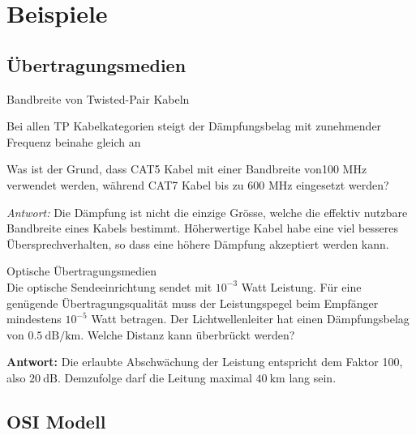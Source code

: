 \section{Beispiele}

\subsection*{Übertragungsmedien}

\begin{example2}{Bandbreite von Twisted-Pair Kabeln}

Bei allen TP Kabelkategorien steigt der Dämpfungsbelag mit zunehmender Frequenz beinahe gleich an

Was ist der Grund, dass CAT5 Kabel mit einer Bandbreite von100 MHz verwendet werden, während CAT7 Kabel bis zu 600 MHz eingesetzt werden?

\emph{Antwort:}
Die Dämpfung ist nicht die einzige Grösse, welche die effektiv nutzbare Bandbreite eines Kabels bestimmt. Höherwertige Kabel habe eine viel besseres Übersprechverhalten, so dass eine höhere Dämpfung akzeptiert werden kann.
\end{example2}

\begin{example2}{Optische Übertragungsmedien}\\
  Die optische Sendeeinrichtung sendet mit $10^{-3}$ Watt Leistung. Für eine genügende Übertragungsqualität muss
  der Leistungspegel beim Empfänger mindestens $10^{-5}$ Watt betragen. Der Lichtwellenleiter hat einen
  Dämpfungsbelag von $0.5 \mathrm{~dB} / \mathrm{km}$. Welche Distanz kann überbrückt werden?

 \textbf{Antwort:}
Die erlaubte Abschwächung der Leistung entspricht dem Faktor 100, also $20 \mathrm{~dB}$. Demzufolge darf die Leitung maximal $40 \mathrm{~km}$ lang sein.
\end{example2}

\subsection*{OSI Modell}

